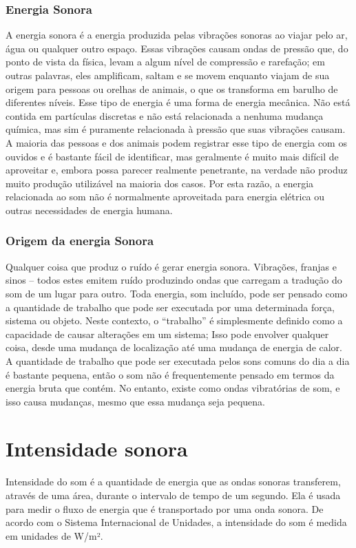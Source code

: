 \documentclass[
	article,			%
	11pt,				%
	oneside,			%
	a4paper,			%
	english,			%
	brazil,				%
	sumario=tradicional
	]{abntex2}
\begin{document}
\subsubsection{Energia Sonora}
A energia sonora é a energia produzida pelas vibrações sonoras ao viajar pelo ar, água ou qualquer outro espaço. Essas vibrações causam ondas de pressão que, do ponto de vista da física, levam a algum nível de compressão e rarefação; em outras palavras, eles amplificam, saltam e se movem enquanto viajam de sua origem para pessoas ou orelhas de animais, o que os transforma em barulho de diferentes níveis. Esse tipo de energia é uma forma de energia mecânica. Não está contida em partículas discretas e não está relacionada a nenhuma mudança química, mas sim é puramente relacionada à pressão que suas vibrações causam.
A maioria das pessoas e dos animais podem registrar esse tipo de energia com os ouvidos e é bastante fácil de identificar, mas geralmente é muito mais difícil de aproveitar e, embora possa parecer realmente penetrante, na verdade não produz muito produção utilizável na maioria dos casos. Por esta razão, a energia relacionada ao som não é normalmente aproveitada para energia elétrica ou outras necessidades de energia humana.

\subsubsection{Origem da energia Sonora}
Qualquer coisa que produz o ruído é gerar energia sonora. Vibrações, franjas e sinos – todos estes emitem ruído produzindo ondas que carregam a tradução do som de um lugar para outro. Toda energia, som incluído, pode ser pensado como a quantidade de trabalho que pode ser executada por uma determinada força, sistema ou objeto.
Neste contexto, o “trabalho” é simplesmente definido como a capacidade de causar alterações em um sistema; Isso pode envolver qualquer coisa, desde uma mudança de localização até uma mudança de energia de calor.
A quantidade de trabalho que pode ser executada pelos sons comuns do dia a dia é bastante pequena, então o som não é frequentemente pensado em termos da energia bruta que contém. No entanto, existe como ondas vibratórias de som, e isso causa mudanças, mesmo que essa mudança seja pequena.

\section{Intensidade sonora}
Intensidade do som é a quantidade de energia que as ondas sonoras transferem, através de uma área, durante o intervalo de tempo de um segundo. Ela é usada para medir o fluxo de energia que é transportado por uma onda sonora. De acordo com o Sistema Internacional de Unidades, a intensidade do som é medida em unidades de W/m².
\end{document}
